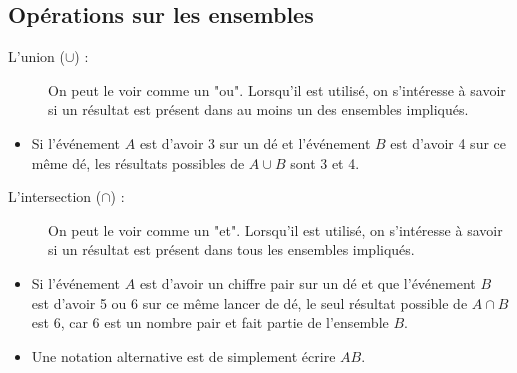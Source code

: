 \documentclass[10pt, french]{article}
\def\firstrectangle{(0,0) rectangle (7, 4)}
\def\firstcircle{(2.5,2) circle (1.5cm)}
\def\secondcircle{(4.5, 2) circle (1.5cm)}
\begin{document}
\begin{multicols*}{2}
\subsection{Opérations sur les ensembles}
\begin{description} 
\item [L'union ({$\cup$}) :] On peut le voir comme un "ou". Lorsqu'il est utilisé, on s'intéresse à savoir si un résultat est présent dans au moins un des ensembles impliqués. 
\end{description}
\begin{itemize}
  	\item	Si l'événement $A$ est d'avoir 3 sur un dé et l'événement $B$ est d'avoir 4 sur ce même dé, les résultats possibles de $ A \cup B$ sont 3 et 4.
\end{itemize}
\begin{center}
\end{center}
\columnbreak
\begin{description} 
 \item[L'intersection ({$\cap$}) :] On peut le voir comme un "et". Lorsqu'il est utilisé, on s'intéresse à savoir si un résultat est présent dans tous les ensembles impliqués.
\end{description}
\begin{itemize}
  	\item	Si l'événement $A$ est d'avoir un chiffre pair sur un dé et que l'événement $B$ est d'avoir 5 ou 6 sur ce même lancer de dé, le seul résultat possible de $A \cap B$ est 6, car 6 est un nombre pair et fait partie de l'ensemble $B$. 
  	\item Une notation alternative est de simplement écrire $AB$.
\end{itemize}
\begin{center}

\end{center}
\end{multicols*}
\end{document}
